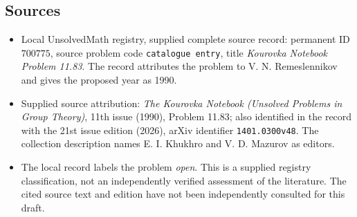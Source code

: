 \documentclass[11pt]{article}
\begin{document}
\subsection{Sources}
\begin{itemize}
\item Local UnsolvedMath registry, supplied complete source record: permanent ID \(700775\), source problem code \texttt{catalogue entry}, title \emph{Kourovka Notebook Problem 11.83}. The record attributes the problem to V. N. Remeslennikov and gives the proposed year as 1990.
\item Supplied source attribution: \emph{The Kourovka Notebook (Unsolved Problems in Group Theory)}, 11th issue (1990), Problem 11.83; also identified in the record with the 21st issue edition (2026), arXiv identifier \texttt{1401.0300v48}. The collection description names E. I. Khukhro and V. D. Mazurov as editors.
\item The local record labels the problem \emph{open}. This is a supplied registry classification, not an independently verified assessment of the literature. The cited source text and edition have not been independently consulted for this draft.
\end{itemize}
\end{document}
